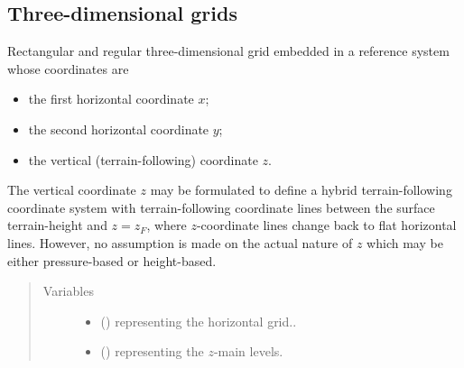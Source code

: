 \documentclass[letterpaper,10pt,english]{sphinxmanual}
\begin{document}
\subsection{Three-dimensional grids}
\label{\detokenize{api:three-dimensional-grids}}

\begin{fulllineitems}
\label{\detokenize{api:tasmania.grids.grid_xyz.GridXYZ}}
Rectangular and regular three-dimensional grid embedded in a reference system whose coordinates are
\begin{itemize}
\item {} 
the first horizontal coordinate \(x\);

\item {} 
the second horizontal coordinate \(y\);

\item {} 
the vertical (terrain-following) coordinate \(z\).

\end{itemize}

The vertical coordinate \(z\) may be formulated to define a hybrid terrain-following coordinate system
with terrain-following coordinate lines between the surface terrain-height and \(z = z_F\), where
\(z\)-coordinate lines change back to flat horizontal lines. However, no assumption is made on the actual
nature of \(z\) which may be either pressure-based or height-based.
\begin{quote}\begin{description}
\item[{Variables}] \leavevmode\begin{itemize}
\item {} 
 () \textendash{} {\hyperref[\detokenize{api:tasmania.grids.grid_xy.GridXY}]{}} representing the horizontal grid..

\item {} 
 () \textendash{} {\hyperref[\detokenize{api:tasmania.grids.axis.Axis}]{}} representing the \(z\)-main levels.


\end{itemize}
\end{description}
\end{quote}
\end{fulllineitems}
\end{document}
